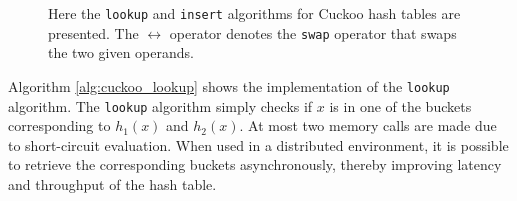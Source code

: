 \begin{figure}
	\centering
	

	\caption{Here the \texttt{lookup} and \texttt{insert} algorithms for Cuckoo hash tables are presented. The $\leftrightarrow$ operator denotes the \texttt{swap} operator that swaps the two given operands.}
\end{figure}

Algorithm \ref{alg:cuckoo_lookup} shows the implementation of the \texttt{lookup} algorithm. The \texttt{lookup} algorithm simply checks if $x$ is in one of the buckets corresponding to $h_1(x)$ and $h_2(x)$. At most two memory calls are made due to short-circuit evaluation. When used in a distributed environment, it is possible to retrieve the corresponding buckets asynchronously, thereby improving latency and throughput of the hash table.

